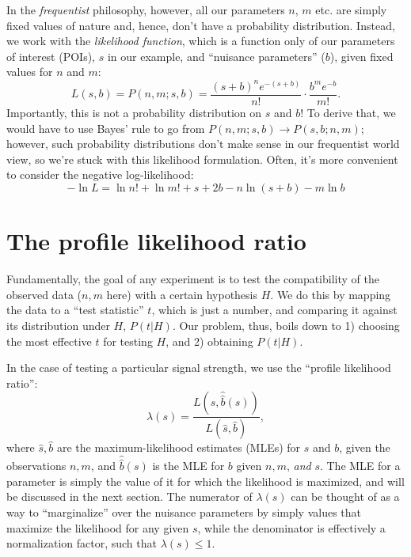 In the \textit{frequentist} philosophy, however, all our parameters $n$, $m$ etc. are simply fixed values of nature and, hence, don't have a probability distribution.
Instead, we work with the \textit{likelihood function}, which is a function only of our parameters of interest (POIs), $s$ in our example, and ``nuisance parameters'' ($b$), given fixed values for $n$ and $m$:
\begin{equation}
\label{eq:likelihood}
L(s, b) = P(n, m; s, b) = \frac{(s+b)^n e^{-(s+b)}}{n!} \cdot \frac{b^m e^{-b}}{m!}.
\end{equation}
Importantly, this is not a probability distribution on $s$ and $b$! To derive that, we would have to use Bayes' rule to go from $P(n, m; s, b) \to P(s, b; n, m)$; however, such probability distributions don't make sense in our frequentist world view, so we're stuck with this likelihood formulation.
Often, it's more convenient to consider the negative log-likelihood:
\begin{equation}
\label{eq:nll}
-\ln L = \ln n! + \ln m! + s + 2b - n\ln(s+b) - m \ln b
\end{equation}

\section{The profile likelihood ratio}

Fundamentally, the goal of any experiment is to test the compatibility of the observed data ($n, m$ here) with a certain hypothesis $H$.
We do this by mapping the data to a ``test statistic'' $t$, which is just a number, and comparing it against its distribution under $H$, $P(t| H)$.
Our problem, thus, boils down to 1) choosing the most effective $t$ for testing $H$, and 2) obtaining $P(t| H)$.

In the case of testing a particular signal strength, we use the ``profile likelihood ratio'':
\begin{equation}
\label{eq:plr}
\lambda(s) = \frac{L(s, \hat{\hat{b}}(s))}{L(\hat{s}, \hat{b})},
\end{equation}
where $\hat{s}, \hat{b}$ are the maximum-likelihood estimates (MLEs) for $s$ and $b$, given the observations $n, m$, and $\hat{\hat{b}}(s)$ is the MLE for $b$ given $n, m$, \textit{and} $s$.
The MLE for a parameter is simply the value of it for which the likelihood is maximized, and will be discussed in the next section.
The numerator of $\lambda(s)$ can be thought of as a way to ``marginalize'' over the nuisance parameters by simply values that maximize the likelihood for any given $s$, while the denominator is effectively a normalization factor, such that $\lambda(s) \leq 1$.


